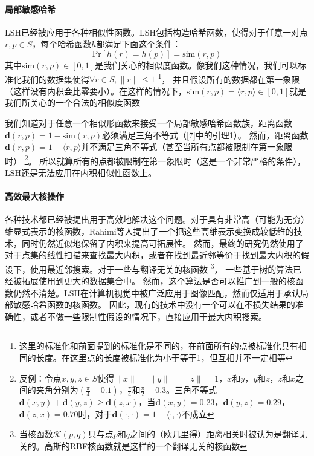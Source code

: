 \documentclass[twocolumn,a4paper]{article}
\begin{document}
\paragraph{局部敏感哈希}LSH已经被应用于各种相似性函数。LSH包括构造哈希函数，使得对于任意一对点$r,p \in S$，每个哈希函数$h$都满足下面这个条件：
\begin{equation}
\mathrm{Pr}[h(r) = h(p)] = \mathrm{sim}(r,p)
\end{equation}
其中$\mathrm{sim}(r,p) \in [0,1]$是我们关心的相似度函数。像我们这种情况，我们可以标准化我们的数据集使得$\forall r \in S, \|r\| \le 1$
\footnote{这里的标准化和前面提到的标准化是不同的，在前面所有的点被标准化具有相同的长度。在这里点的长度被标准化为小于等于1，但互相并不一定相等}，
并且假设所有的数据都在第一象限（这样没有内积会比零要小）。在这样的情况下，$\mathrm{sim}(r,p) = \langle r,p \rangle \in [0,1]$就是我们所关心的一个合法的相似度函数

我们知道对于任意一个相似形函数来接受一个局部敏感哈希函数族，距离函数$\mathbf{d}(r,p) = 1 - \mathrm{sim}(r,p)$必须满足三角不等式（[7]中的引理1）。
然而，距离函数$\mathbf{d}(r, p) = 1 - \langle r,p \rangle$并不满足三角不等式（甚至当所有点都被限制在第一象限时）
\footnote{反例：令点$x,y,z\in S$使得$\|x\|=\|y\|=\|z\|=1$，$x$和$y$，$y$和$z$，$z$和$x$之间的夹角分别为$\left(\frac{\pi}{4} - 0.1\right)$，$\frac{\pi}{4}$和$\frac{\pi}{2} - 0.3$。三角不等式$\mathbf{d}(x,y)+\mathbf{d}(y,z)\ge\mathbf{d}(z,x)$，当$\mathbf{d}(x,y) = 0.23$，$\mathbf{d}(y,z)=0.29$，$\mathbf{d}(z,x)=0.70$时，对于$\mathbf{d}(\cdot,\cdot)=1-\langle \cdot,\cdot \rangle$不成立}。
所以就算所有的点都被限制在第一象限时（这是一个非常严格的条件），LSH还是无法应用在内积相似性函数上。

\paragraph{高效最大核操作}各种技术都已经被提出用于高效地解决这个问题。对于具有非常高（可能为无穷）维显式表示的核函数，Rahimi等人提出了一个把这些高维表示变换成较低维的技术，同时仍然近似地保留了内积来提高可拓展性。
然而，最终的研究仍然使用了对于点集的线性扫描来查找最大内积，或者在找到最近邻等价于找到最大内积的假设下，使用最近邻搜索。对于一些与翻译无关的核函数
\footnote{当核函数$\mathcal{K}(p,q)$只与点$p$和$q$之间的（欧几里得）距离相关时被认为是翻译无关的。高斯的RBF核函数就是这样的一个翻译无关的核函数}，
一些基于树的算法已经被拓展使用到更大的数据集合中。
然而，这个算法是否可以推广到一般的核函数仍然不清楚。LSH在计算机视觉中被广泛应用于图像匹配，然而仅适用于承认局部敏感哈希函数的核函数。
因此，现有的技术中没有一个可以在不损失结果的准确性，或者不做一些限制性假设的情况下，直接应用于最大内积搜索。
\end{document}
